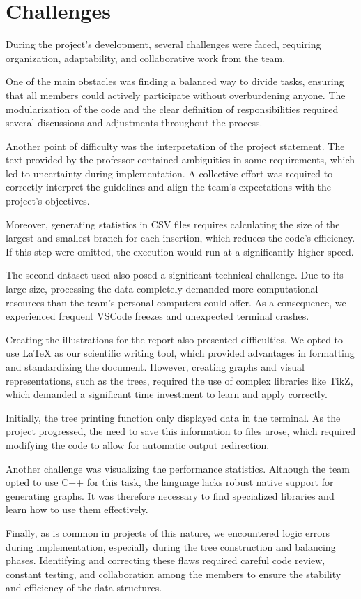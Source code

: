 \section{Challenges}

During the project's development, several challenges were faced, requiring organization, adaptability, and collaborative work from the team.

One of the main obstacles was finding a balanced way to divide tasks, ensuring that all members could actively participate without overburdening anyone. The modularization of the code and the clear definition of responsibilities required several discussions and adjustments throughout the process.

Another point of difficulty was the interpretation of the project statement. The text provided by the professor contained ambiguities in some requirements, which led to uncertainty during implementation. A collective effort was required to correctly interpret the guidelines and align the team's expectations with the project's objectives.

Moreover, generating statistics in CSV files requires calculating the size of the largest and smallest branch for each insertion, which reduces the code's efficiency. If this step were omitted, the execution would run at a significantly higher speed.

The second dataset used also posed a significant technical challenge. Due to its large size, processing the data completely demanded more computational resources than the team's personal computers could offer. As a consequence, we experienced frequent VSCode freezes and unexpected terminal crashes.

Creating the illustrations for the report also presented difficulties. We opted to use LaTeX as our scientific writing tool, which provided advantages in formatting and standardizing the document. However, creating graphs and visual representations, such as the trees, required the use of complex libraries like TikZ, which demanded a significant time investment to learn and apply correctly.

Initially, the tree printing function only displayed data in the terminal. As the project progressed, the need to save this information to files arose, which required modifying the code to allow for automatic output redirection.

Another challenge was visualizing the performance statistics. Although the team opted to use C++ for this task, the language lacks robust native support for generating graphs. It was therefore necessary to find specialized libraries and learn how to use them effectively.

Finally, as is common in projects of this nature, we encountered logic errors during implementation, especially during the tree construction and balancing phases. Identifying and correcting these flaws required careful code review, constant testing, and collaboration among the members to ensure the stability and efficiency of the data structures.